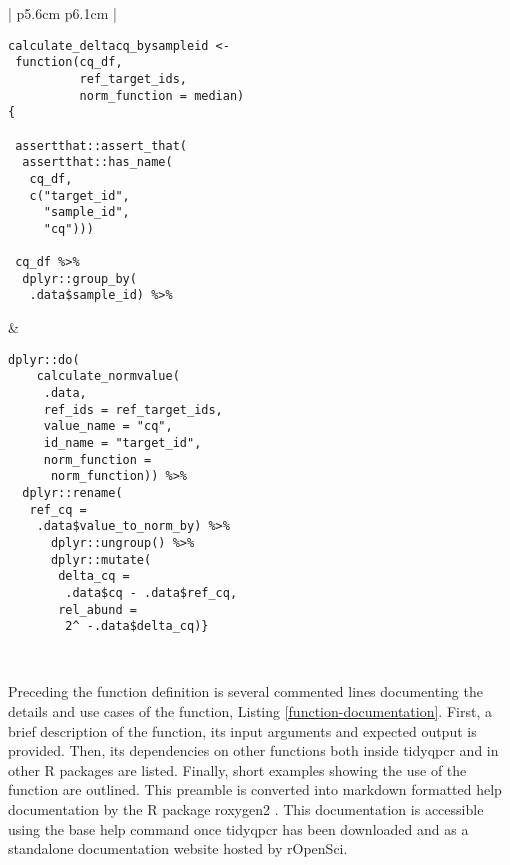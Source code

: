 \documentclass[../main.tex]{subfiles}
\begin{document}
\begin{table}
\centering
\begin{tabular}{| p{5.6cm}  p{6.1cm} |}
\hline
\begin{lstlisting}[style=mystyle]
calculate_deltacq_bysampleid <- 
 function(cq_df,
          ref_target_ids,
          norm_function = median) 
{

 assertthat::assert_that(
  assertthat::has_name(
   cq_df, 
   c("target_id",
     "sample_id",
     "cq")))
     
 cq_df %>%
  dplyr::group_by(
   .data$sample_id) %>%
\end{lstlisting} &

\begin{lstlisting}[firstnumber=17, style=mystyle]
   dplyr::do(
    calculate_normvalue(
     .data,
     ref_ids = ref_target_ids,
     value_name = "cq",
     id_name = "target_id",
     norm_function = 
      norm_function)) %>%
  dplyr::rename(
   ref_cq = 
    .data$value_to_norm_by) %>%
      dplyr::ungroup() %>%
      dplyr::mutate(
       delta_cq = 
        .data$cq - .data$ref_cq,
       rel_abund = 
        2^ -.data$delta_cq)}
\end{lstlisting} \\
\hline
\end{tabular}
\caption{Function definition for the calculate $\Delta$Cq method within tidyqpcr. This example showcases the use of the \lstinline{group_by} function provided by the core tidyverse package dplyr to split the Cq values by \lstinline{sample_id} and apply the \lstinline{calculate_normvalue} on each group separately.}
\label{define-function}
\end{table}
Preceding the function definition is several commented lines documenting the details and use cases of the function, Listing \ref{function-documentation}. 
First, a brief description of the function, its input arguments and expected output is provided. 
Then, its dependencies on other functions both inside tidyqpcr and in other R packages are listed. 
Finally, short examples showing the use of the function are outlined. 
This preamble is converted into markdown formatted help documentation by the R package roxygen2 \parencite{Wickham2021}. 
This documentation is accessible using the base help command once tidyqpcr has been downloaded and as a standalone documentation website hosted by rOpenSci.
\end{document}
